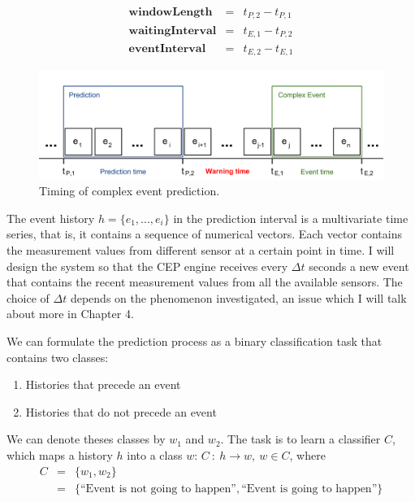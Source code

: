 \begin{eqnarray}
\textbf{windowLength} &=& t_{P,2} - t_{P,1} \\
\textbf{waitingInterval} &=& t_{E,1} - t_{P,2} \\ 
\textbf{eventInterval} &=& t_{E,2} - t_{E,1} 
\end{eqnarray}

\begin{figure}[here]
\centering
\includegraphics[scale=0.7]{images/prediction_time_span.pdf}
\caption{Timing of complex event prediction.}
\label{fig:prediction_time_span}
\end{figure}

The event history $h = \{e_1, ..., e_i\}$ in the prediction interval is a multivariate time series, that is, it contains a sequence of numerical vectors. \cite{Xing10} Each vector contains the measurement values from different sensor at a certain point in time. I will design the system so that the CEP engine receives every $\Delta t$ seconds a new event that contains the recent measurement values from all the available sensors. The choice of $\Delta t$ depends on the phenomenon investigated, an issue which I will talk about more in Chapter 4.

We can formulate the prediction process as a binary classification task that contains two classes:
\begin{enumerate}
\item{Histories that precede an event}
\item{Histories that do not precede an event}
\end{enumerate} 

We can denote theses classes by $w_1$ and $w_2$.
The task is to learn a classifier $C$, which maps a history $h$ into a class $w$: $C \ : \ h \rightarrow w, \ w \in C$, where 
\begin{eqnarray*}
C &=& \{w_1, w_2\} \label{eq:classification} \\
&=& \{\text{``Event is not going to happen''}, \text{``Event is going to happen''}\}
\end{eqnarray*}

